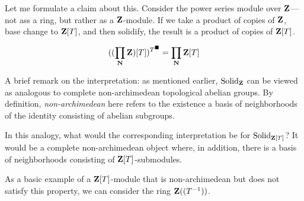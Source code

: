 Let me formulate a claim about this. Consider the power series module over $\mathbf Z$--- not ass a ring, but rather as a $\mathbf Z$-module. If we take a product of copies of $\mathbf Z$, base change to $\mathbf Z[T]$, and then solidify, the result is a product of copies of $\mathbf Z[T]$.

\begin{align*}
((\prod_\mathbf N \mathbf Z)[T])^{T^\blacksquare} = \prod_\mathbf N \mathbf Z[T]
\end{align*}
\ecl

\begin{remark}
A brief remark on the interpretation: as mentioned earlier, $\mathrm{Solid}_\mathbf Z$  can be viewed as analogous to complete non-archimedean topological abelian groups. By definition, \emph{non-archimedean} here refers to the existence a basis of neighborhoods of the identity consisting of abelian subgroups.

In this analogy, what would the corresponding interpretation be for $\mathrm{Solid}_{\mathbf Z[T]}$? It would be a complete non-archimedean object where, in addition, there is a basis of neighborhoods consisting of $\mathbf Z[T]$-submodules. 

As a basic example of a $\mathbf Z[T]$-module that is non-archimedean but does not satisfy this property, we can consider the ring $\mathbf Z((T^{-1}))$. 
\end{remark}
